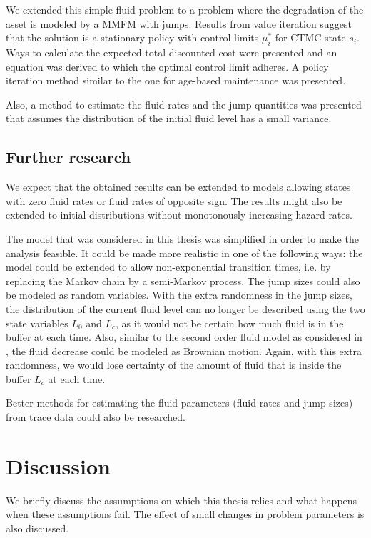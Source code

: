 We extended this simple fluid problem to a problem where the degradation of the asset is modeled by a MMFM with jumps.
Results from value iteration suggest that the solution is a stationary policy with control limits $\mu_i^*$ for CTMC-state $s_i$.
Ways to calculate the expected total discounted cost were presented and an equation was derived to which the optimal control limit adheres.
A policy iteration method similar to the one for age-based maintenance was presented.

Also, a method to estimate the fluid rates and the jump quantities was presented that assumes the distribution of the initial fluid level has a small variance.

\section{Further research}
We expect that the obtained results can be extended to models allowing states with zero fluid rates or fluid rates of opposite sign.
The results might also be extended to initial distributions without monotonously increasing hazard rates.

The model that was considered in this thesis was simplified in order to make the analysis feasible.
It could be made more realistic in one of the following ways:
the model could be extended to allow non-exponential transition times, i.e. by replacing the Markov chain by a semi-Markov process.
The jump sizes could also be modeled as random variables.
With the extra randomness in the jump sizes, the distribution of the current fluid level can no longer be described using the two state variables $L_0$ and $L_c$, as it would not be certain how much fluid is in the buffer at each time.
Also, similar to the second order fluid model as considered in \cite{Gribaudo2007}, the fluid decrease could be modeled as Brownian motion.
Again, with this extra randomness, we would lose certainty of the amount of fluid that is inside the buffer $L_c$ at each time.

Better methods for estimating the fluid parameters (fluid rates and jump sizes) from trace data could also be researched.

\chapter{Discussion}\label{chapter:discussion}
We briefly discuss the assumptions on which this thesis relies and what happens when these assumptions fail.
The effect of small changes in problem parameters is also discussed.
